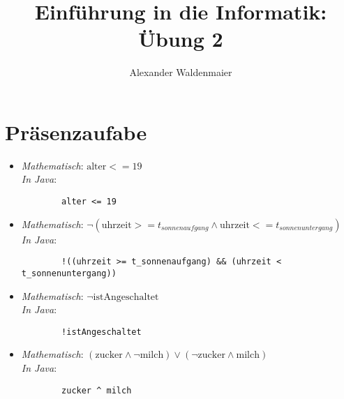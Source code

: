 \documentclass{article}
\title{Einführung in die Informatik: Übung 2}
\author{Alexander Waldenmaier}
\begin{document}
    \maketitle
    \section*{Präsenzaufabe}
    \begin{itemize}
        \item \textit{Mathematisch}: $\mathrm{alter} <= 19$ \\
        \textit{In Java}: \begin{lstlisting}
        alter <= 19
        \end{lstlisting}
        \item \textit{Mathematisch}: $\neg\left(\mathrm{uhrzeit} >= t_{sonnenaufgang} \wedge \mathrm{uhrzeit} <= t_{sonnenuntergang}\right)$\\
        \textit{In Java}: \begin{lstlisting}
        !((uhrzeit >= t_sonnenaufgang) && (uhrzeit < t_sonnenuntergang))
        \end{lstlisting}
        \item \textit{Mathematisch}: $\neg \mathrm{istAngeschaltet}$\\
        \textit{In Java}: \begin{lstlisting}
        !istAngeschaltet
        \end{lstlisting}
        \item \textit{Mathematisch}: $(\mathrm{zucker} \wedge \neg \mathrm{milch}) \vee (\neg \mathrm{zucker} \wedge \mathrm{milch})$\\
        \textit{In Java}: \begin{lstlisting}
        zucker ^ milch
        \end{lstlisting}
    \end{itemize}
\end{document}
